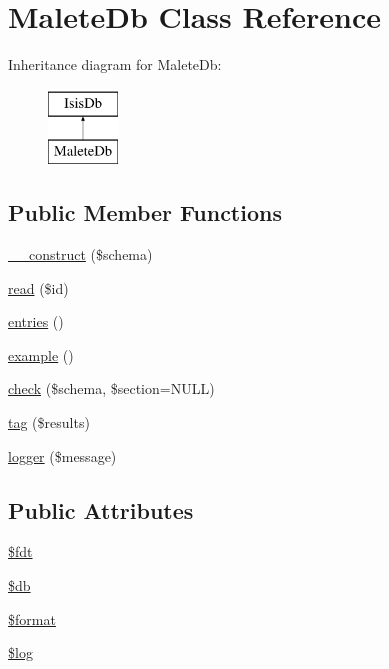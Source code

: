 \hypertarget{classMaleteDb}{
\section{MaleteDb Class Reference}
\label{classMaleteDb}
}
Inheritance diagram for MaleteDb:\begin{figure}[H]
\begin{center}
\leavevmode
\includegraphics[height=2.000000cm]{classMaleteDb}
\end{center}
\end{figure}
\subsection*{Public Member Functions}
\begin{DoxyCompactItemize}
\item 
\hyperlink{classMaleteDb_a60f87371bc1ec156b010e5b38b4c22e2}{\_\-\_\-construct} (\$schema)
\item 
\hyperlink{classMaleteDb_ad2a65876db24adc388afce465e0c153e}{read} (\$id)
\item 
\hyperlink{classMaleteDb_a5c6cb09a072e5d2ddce31c77098ccba4}{entries} ()
\item 
\hyperlink{classMaleteDb_a4f16c48facae498d0db1a042e9727d04}{example} ()
\item 
\hyperlink{classMaleteDb_ab2da32d84af17df79d947ae32257b4ec}{check} (\$schema, \$section=NULL)
\item 
\hyperlink{classMaleteDb_ac87c3ac1b3d9a6297be8574aa303e033}{tag} (\$results)
\item 
\hyperlink{classMaleteDb_a17562c1c53594762454d65be823fcdb5}{logger} (\$message)
\end{DoxyCompactItemize}
\subsection*{Public Attributes}
\begin{DoxyCompactItemize}
\item 
\hyperlink{classMaleteDb_af2cd60ce81381edc3ca09a6812cf79fd}{\$fdt}
\item 
\hyperlink{classMaleteDb_a4b970df3631d2763f001c96ee417f27a}{\$db}
\item 
\hyperlink{classMaleteDb_a833fed4faae9537306053ee966c06197}{\$format}
\item 
\hyperlink{classMaleteDb_ae1c8cefd1a6e661fb03c214f47336368}{\$log}
\end{DoxyCompactItemize}


